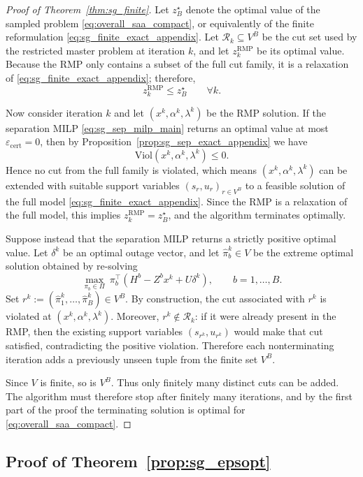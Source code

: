 \begin{proof}[Proof of Theorem~\ref{thm:sg_finite}]
Let $z_B^{\star}$ denote the optimal value of the sampled problem \eqref{eq:overall_saa_compact},
or equivalently of the finite reformulation \eqref{eq:sg_finite_exact_appendix}. Let
$\mathcal R_k\subseteq V^B$ be the cut set used by the restricted master problem at iteration $k$,
and let $z_k^{\mathrm{RMP}}$ be its optimal value.
Because the RMP only contains a subset of the full cut family, it is a relaxation of
\eqref{eq:sg_finite_exact_appendix}; therefore,
\[
z_k^{\mathrm{RMP}}\le z_B^{\star}
\qquad \forall k.
\]

Now consider iteration $k$ and let $(x^k,\alpha^k,\lambda^k)$ be the RMP solution.
If the separation MILP \eqref{eq:sg_sep_milp_main} returns an optimal value at most
$\varepsilon_{\mathrm{cert}}=0$, then by Proposition~\ref{prop:sg_sep_exact_appendix} we have
\[
\mathrm{Viol}(x^k,\alpha^k,\lambda^k)\le 0.
\]
Hence no cut from the full family is violated, which means $(x^k,\alpha^k,\lambda^k)$ can be extended with suitable
support variables $(s_r,u_r)_{r\in V^B}$ to a feasible solution of the full model
\eqref{eq:sg_finite_exact_appendix}. Since the RMP is a relaxation of the full model, this implies
$z_k^{\mathrm{RMP}}=z_B^{\star}$, and the algorithm terminates optimally.

Suppose instead that the separation MILP returns a strictly positive optimal value. Let $\delta^k$ be an optimal
outage vector, and let $\widehat\pi_b^k\in V$ be the extreme optimal solution obtained by re-solving
\[
\max_{\pi_b\in\Pi}\ \pi_b^\top(H^b-Z^b x^k+U\delta^k),
\qquad b=1,\ldots,B.
\]
Set $r^k:=(\widehat\pi_1^k,\ldots,\widehat\pi_B^k)\in V^B$.
By construction, the cut associated with $r^k$ is violated at $(x^k,\alpha^k,\lambda^k)$.
Moreover, $r^k\notin\mathcal R_k$: if it were already present in the RMP, then the existing support variables
$(s_{r^k},u_{r^k})$ would make that cut satisfied, contradicting the positive violation.
Therefore each nonterminating iteration adds a previously unseen tuple from the finite set $V^B$.

Since $V$ is finite, so is $V^B$. Thus only finitely many distinct cuts can be added. The algorithm must therefore stop
after finitely many iterations, and by the first part of the proof the terminating solution is optimal for
\eqref{eq:overall_saa_compact}.
\end{proof}

\subsection{Proof of Theorem~\ref{prop:sg_epsopt}}

